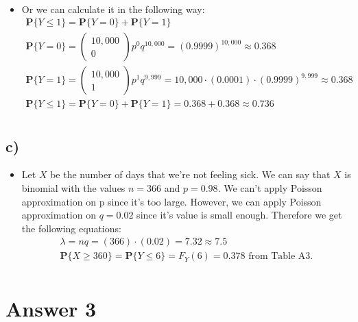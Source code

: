 \documentclass[12pt]{article}
\begin{document}
\begin{itemize}
\begin{equation*}
\begin{split}
    \end{split}
 \end{equation*}
 \item Or we can calculate it in the following way:
 \begin{equation*}
    \begin{split}
        \textbf{P}\{Y \leq 1\} = \textbf{P}\{Y = 0\} + \textbf{P}\{Y = 1\}\\
        \textbf{P}\{Y = 0\} = \begin{pmatrix} 10,000 \\ 0 \end{pmatrix}p^0q^{10,000} = (0.9999)^{10,000} \approx 0.368\\
        \textbf{P}\{Y = 1\} = \begin{pmatrix} 10,000 \\ 1 \end{pmatrix}p^1q^{9,999} = 10,000\cdot(0.0001)\cdot(0.9999)^{9,999} \approx 0.368\\
        \textbf{P}\{Y \leq 1\} = \textbf{P}\{Y = 0\} + \textbf{P}\{Y = 1\} = 0.368 + 0.368 \approx 0.736\\
    \end{split}
 \end{equation*}
\end{itemize}


\subsection*{c)}
\begin{itemize}
 \item Let $X$ be the number of days that we're not feeling sick. We can say that $X$ is binomial with the values $n = 366$ and $p = 0.98$. We can't apply Poisson approximation on p since it's too large. However, we can apply Poisson approximation on $q = 0.02$ since it's value is small enough. Therefore we get the following equations:
 \begin{equation*}
    \begin{split}
    \lambda = nq = (366)\cdot(0.02) = 7.32 \approx 7.5 \\
        \textbf{P}\{X \geq 360\} = \textbf{P}\{Y \leq 6\} = F_Y(6) = 0.378 \text{ from Table A3.}\\
    \end{split}
 \end{equation*}
\end{itemize}



\section*{Answer 3}
\end{document}
